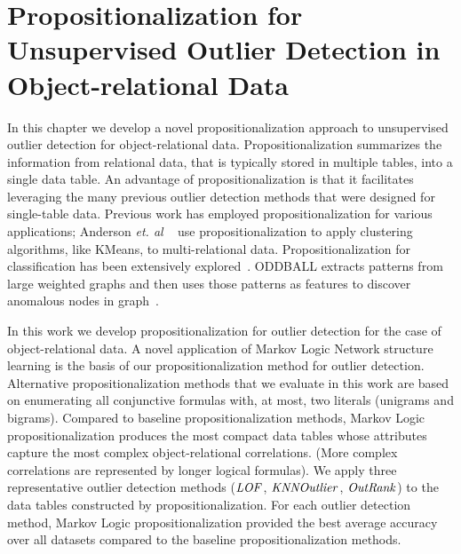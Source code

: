 
%
%

\chapter [Propositionalization for Outlier Detection]{Propositionalization for Unsupervised Outlier Detection in Object-relational Data}\label{chap:four}

	In this chapter we develop a novel propositionalization  approach to unsupervised outlier detection for object-relational data. Propositionalization summarizes the information from relational data, that is typically stored in multiple tables, into a single data table. An advantage of propositionalization is that it facilitates leveraging the many previous outlier detection methods that were designed for single-table data. 
	Previous work has employed propositionalization for various applications; Anderson {\em et. al} ~\cite{Anderson2007} use propositionalization to apply clustering algorithms, like KMeans, to multi-relational data. Propositionalization for classification has been extensively explored~\cite{Kramer2000,Lavrac13,Lavravc2014,kuzelka2008}. ODDBALL extracts patterns from large weighted graphs and then uses those patterns as features to discover anomalous nodes in graph~\cite{Akoglu2010}.
	
	In this work we develop propositionalization for outlier detection for the case of object-relational data. 
	A novel application of Markov Logic Network structure learning is the basis of our propositionalization method for outlier detection. 
	Alternative propositionalization methods that we evaluate in this work are based on enumerating all conjunctive formulas with, at most, two literals (unigrams and bigrams). 
	Compared to baseline propositionalization methods, Markov Logic propositionalization produces the most compact data tables whose attributes capture the most complex object-relational correlations. (More complex correlations are represented by longer logical formulas). We apply three representative outlier detection methods ($\it{LOF}$, $\it{KNNOutlier}$, $\it{OutRank}$) to the data tables constructed by %
	propositionalization.
	For each outlier detection method, Markov Logic propositionalization provided the best average accuracy over all datasets compared to the baseline propositionalization methods.
